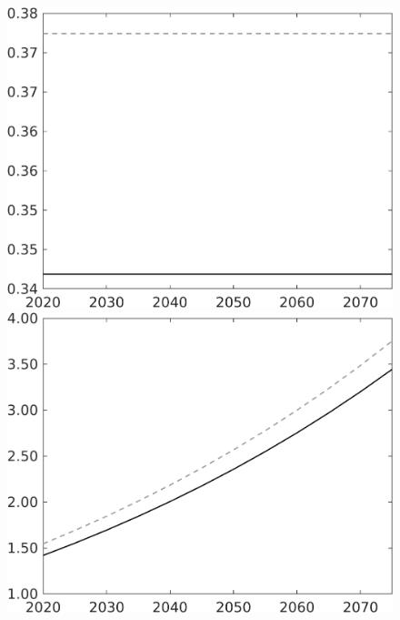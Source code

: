 \documentclass[12pt]{article}
\begin{document}
\begin{figure}[h!!]
\begin{minipage}[]{0.32\textwidth}
	\end{minipage}	
	\begin{minipage}[]{0.32\textwidth}
		\includegraphics[width=1\textwidth]{../../codding_model/own_basedOnFried/optimalPol_010922_revision/figures/all_13Sept22/CompTaul_LFBAU_Reg0_hh_spillover0_nsk1_xgr0_knspil0_sep1_countec0_GovRev0_etaa0.79_lgd0.png}
	\end{minipage}	
	\begin{minipage}[]{0.32\textwidth}
		\includegraphics[width=1\textwidth]{../../codding_model/own_basedOnFried/optimalPol_010922_revision/figures/all_13Sept22/CompTaul_LFBAU_Reg0_C_spillover0_nsk1_xgr0_knspil0_sep1_countec0_GovRev0_etaa0.79_lgd0.png}

\end{minipage}
\end{figure}
\end{document}
